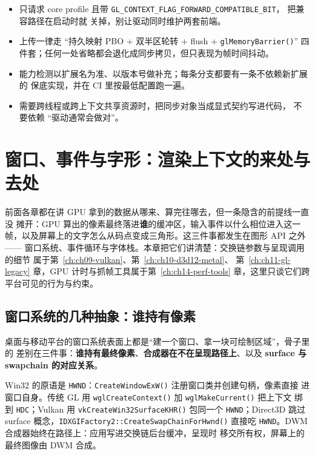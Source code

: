 \documentclass[12pt,a4paper,fontset=fandol]{ctexbook}
\newcommand{\Fn}[1]{\texttt{#1()}}
\newcommand{\Tp}[1]{\texttt{#1}}
\newcommand{\Bk}{\discretionary{}{}{}}
\begin{document}
\begin{bestpractice}[title={用 OpenGL 但不掉进遗产陷阱}]
\begin{itemize}
\item 只请求 core profile 且带 \Tp{GL\_CONTEXT\_FLAG\Bk\_FORWARD\_COMPATIBLE\_BIT}，
把兼容路径在启动时就
关掉，别让驱动同时维护两套前端。
\item 上传一律走 ``持久映射 PBO + 双半区轮转 + flush + \Fn{glMemoryBarrier}''
四件套；任何一处省略都会退化成同步拷贝，但只表现为帧时间抖动。
\item 能力检测以扩展名为准、以版本号做补充；每条分支都要有一条不依赖新扩展的
保底实现，并在 CI 里按最低配置跑一遍。
\item 需要跨线程或跨上下文共享资源时，把同步对象当成显式契约写进代码，
不要依赖 ``驱动通常会做对''。
\end{itemize}
\end{bestpractice}

\chapter{窗口、事件与字形：渲染上下文的来处与去处}
\label{ch:ch12-window-text}

前面各章都在讲 GPU 拿到的数据从哪来、算完往哪去，但一条隐含的前提线一直没
摊开：GPU 算出的像素最终落进\textbf{谁}的缓冲区，输入事件以什么相位进入这一
帧，以及屏幕上的文字怎么从码点变成三角形。这三件事都发生在图形 API 之外——
窗口系统、事件循环与字体栈。本章把它们讲清楚：交换链参数与呈现调用的细节
属于第~\ref{ch:ch09-vulkan}、第~\ref{ch:ch10-d3d12-metal}、
第~\ref{ch:ch11-gl-legacy} 章，GPU 计时与抓帧工具属于第~\ref{ch:ch14-perf-tools}
章，这里只谈它们跨平台可见的行为与约束。

\section{窗口系统的几种抽象：谁持有像素}
\label{sec:ch12-window-abstraction}

桌面与移动平台的窗口系统表面上都是``建一个窗口、拿一块可绘制区域''，骨子里的
差别在三件事：\textbf{谁持有最终像素}、\textbf{合成器在不在呈现路径上}、以及
\textbf{surface 与 swapchain 的对应关系}。

Win32 的原语是 \Tp{HWND}：\Fn{CreateWindowExW} 注册窗口类并创建句柄，像素直接
进窗口自身。传统 GL 用 \Fn{wglCreateContext} 加 \Fn{wglMakeCurrent} 把上下文
绑到 \Tp{HDC}；Vulkan 用 \Fn{vk{\Bk}CreateWin32{\Bk}SurfaceKHR} 包同一个
\Tp{HWND}；Direct3D 跳过 surface 概念，\Fn{IDXGIFactory2::{\Bk}CreateSwap{\Bk}ChainForHwnd}
直接吃 \Tp{HWND}。DWM 合成器始终在路径上：应用写进交换链后台缓冲，呈现时
移交所有权，屏幕上的最终图像由 DWM 合成。
\end{document}
